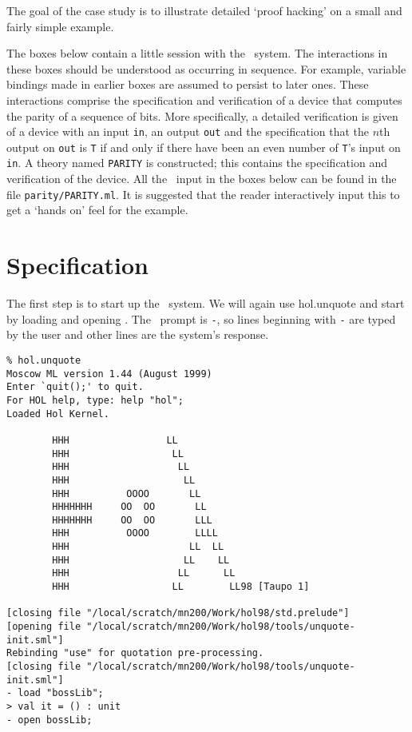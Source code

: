 The goal of the case study is to illustrate detailed `proof hacking'
on a small and fairly simple example.

The boxes below contain a little session with the \HOL\ system.  The
interactions in these boxes should be understood as occurring in
sequence.  For example, variable bindings made in earlier boxes are
assumed to persist to later ones.  These interactions comprise the
specification and verification of a device that computes the parity of
a sequence of bits.  More specifically, a detailed verification is
given of a device with an input {\small\verb|in|}, an output
{\small\verb|out|} and the specification that the $n$th output on
{\small\verb|out|} is {\small\verb|T|} if and only if there have been
an even number of {\small\verb|T|}'s input on {\small\verb|in|}. A
theory named {\small\verb|PARITY|} is constructed; this contains the
specification and verification of the device. All the \ML\ input in
the boxes below can be found in the file
{\small\verb|parity/PARITY.ml|}. It is suggested that the reader
interactively input this to get a `hands on' feel for the example.


\section{Specification}
\label{example}
The first step is to start up the \HOL\ system.  We will again use
\textsf{hol.unquote} and start by loading and opening .
The \ML\ prompt is {\small\verb|-|}, so lines beginning with
{\small\verb|-|} are typed by the user and other lines are the
system's response.

\setcounter{sessioncount}{1}
\begin{session}\begin{verbatim}
% hol.unquote
Moscow ML version 1.44 (August 1999)
Enter `quit();' to quit.
For HOL help, type: help "hol";
Loaded Hol Kernel.

        HHH                 LL
        HHH                  LL
        HHH                   LL
        HHH                    LL
        HHH          OOOO       LL
        HHHHHHH     OO  OO       LL
        HHHHHHH     OO  OO       LLL
        HHH          OOOO        LLLL
        HHH                     LL  LL
        HHH                    LL    LL
        HHH                   LL      LL
        HHH                  LL        LL98 [Taupo 1]

[closing file "/local/scratch/mn200/Work/hol98/std.prelude"]
[opening file "/local/scratch/mn200/Work/hol98/tools/unquote-init.sml"]
Rebinding "use" for quotation pre-processing.
[closing file "/local/scratch/mn200/Work/hol98/tools/unquote-init.sml"]
- load "bossLib";
> val it = () : unit
- open bossLib;
\end{verbatim}
\end{session}

